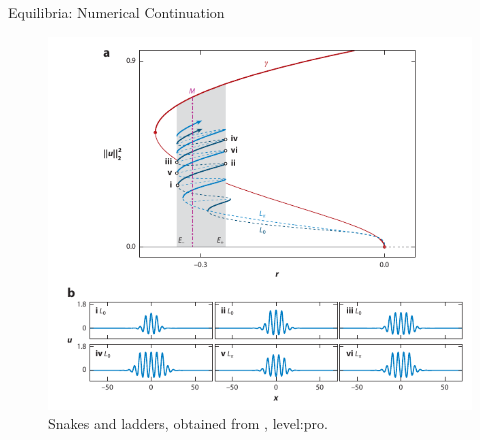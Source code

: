 \documentclass{beamer}
\begin{document}
\begin{frame}{Equilibria: Numerical Continuation}
\begin{figure}[ht]
  \centering
  \includegraphics[scale=0.5]
  {Figs/sh_snaking_real.png}  
  \caption{Snakes and ladders, obtained from \cite{knobloch2015spatial}, level:pro.}
  \label{fig:sh_snaking_real}
\end{figure}

\end{frame}
\end{document}
